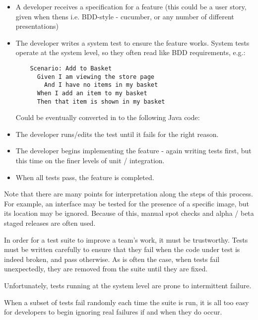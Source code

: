 \begin{itemize}
	\item A developer receives a specification for a feature (this could be a user story, given when thens i.e. BDD-style - cucumber, or any number of different presentations)

	\item The developer writes a system test to ensure the feature works. System tests operate at the system level, so they often read like BDD requirements, e.g.:

	\begin{verbatim}
  	Scenario: Add to Basket
  	  Given I am viewing the store page
  	    And I have no items in my basket
  	  When I add an item to my basket
  	  Then that item is shown in my basket
	\end{verbatim}

	Could be eventually converted in to the following Java code:

	

	\item The developer runs/edits the test until it fails for the right reason.

	\item The developer begins implementing the feature - again writing tests first, but this time on the finer levels of unit / integration.

	\item When all tests pass, the feature is completed.
\end{itemize}

Note that there are many points for interpretation along the steps of this process. For example, an interface may be tested for the presence of a specific image, but its location may be ignored. Because of this, manual spot checks and alpha / beta staged releases are often used.

In order for a test suite to improve a team’s work, it must be trustworthy. Tests must be written carefully to ensure that they fail when the code under test is indeed broken, and pass otherwise. As is often the case, when tests fail unexpectedly, they are removed from the suite until they are fixed.

Unfortunately, tests running at the system level are prone to intermittent failure.

When a subset of tests fail randomly each time the suite is run, it is all too easy for developers to begin ignoring real failures if and when they do occur.
